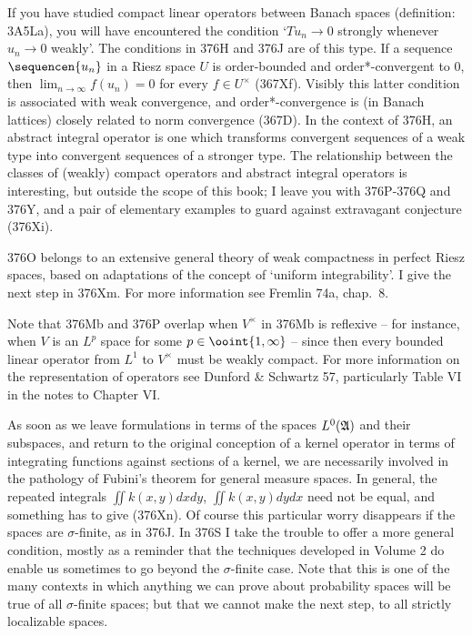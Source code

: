 {If you have studied compact linear operators between Banach spaces
(definition:  3A5La), you will have encountered the condition
`$Tu_n\to 0$ strongly whenever $u_n\to 0$ weakly'.   The conditions in
376H and
376J are of this type.   If a sequence $\sequencen{u_n}$ in a Riesz
space $U$ is order-bounded and order*-convergent to $0$, then
$\lim_{n\to\infty}f(u_n)=0$ for every $f\in U^{\times}$ (367Xf).
Visibly this latter condition is associated
with weak convergence, and order*-convergence is (in Banach lattices)
closely related to norm convergence (367D).   In the context of
376H, an abstract integral operator is one which transforms convergent
sequences of a weak type into convergent sequences of a stronger type.
The relationship between the classes of (weakly) compact operators and
abstract integral operators is interesting, but outside the scope of
this book;  I leave you with 376P-376Q and 376Y, and a pair of
elementary examples to guard against extravagant conjecture (376Xi).

376O belongs to an extensive general theory of weak compactness in
perfect Riesz spaces, based on adaptations of the concept of `uniform
integrability'.  I give the next step in 376Xm.   For more information
see {\smc Fremlin 74a}, chap.\ 8.

Note that 376Mb and 376P overlap when $V^{\times}$ in 376Mb is reflexive
-- for instance, when $V$ is an $L^p$ space for some
$p\in\ooint{1,\infty}$ -- since then every bounded linear operator from
$L^1$ to $V^{\times}$ must be weakly compact.   For more information on the
representation of operators see {\smc Dunford \& Schwartz 57},
particularly Table VI in the notes to Chapter VI.

As soon as we leave formulations in terms of the spaces $L^0(\frak A)$
and their subspaces, and return to the original conception of a
kernel operator in terms of integrating functions against sections of
a kernel, we are necessarily involved in the pathology of Fubini's
theorem for general measure spaces.   In general, the repeated integrals
$\iint k(x,y)dxdy$, $\iint k(x,y)dydx$ need not be equal, and something
has to give (376Xn).   Of course this particular worry disappears if the
spaces are $\sigma$-finite, as in 376J.  In 376S I take the trouble to
offer a more general condition,
mostly as a reminder that the techniques developed in Volume 2
do enable us sometimes to go beyond the $\sigma$-finite case.   Note
that this is one of the many contexts in which anything we can prove
about probability spaces will be true of all $\sigma$-finite spaces;
but that we cannot make the next step, to all strictly localizable
spaces.

}
